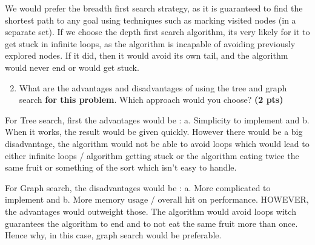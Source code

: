 \documentclass[11pt,a4paper]{../template/report}
\begin{document}
\begin{answer}
We would prefer the breadth first search strategy, as it is guaranteed to find the shortest path to any goal using techniques such as marking visited nodes (in a separate set).
If we choose the depth first search algorithm, its very likely for it to get stuck in infinite loops, as the algorithm is incapable of avoiding previously explored nodes. If it did,
then it would avoid its own tail, and the algorithm would never end or would get stuck.
\end{answer}



\begin{enumerate}
\setcounter{enumi}{1}
\begin{enumerate}
\setcounter{enumii}{1}
    \item What are the advantages and disadvantages of using the tree and graph search \textbf{for this problem}. Which approach would you choose? \textbf{(2 pts)}
\end{enumerate}
\end{enumerate}

\begin{answers}[4cm]
For Tree search, first the advantages would be : a. Simplicity to implement and b. When it works, the result would be given quickly.
However there would be a big disadvantage, the algorithm would not be able to avoid loops which would lead to either infinite loops / algorithm getting stuck or the algorithm eating twice the same fruit or something of the sort which isn't easy to handle.

For Graph search, the disadvantages would be : a. More complicated to implement and b. More memory usage / overall hit on performance.
HOWEVER, the advantages would outweight those. The algorithm would avoid loops witch guarantees the algorithm to end and to not eat the same fruit more than once.
Hence why, in this case, graph search would be preferable.
\end{answers}
\end{document}
